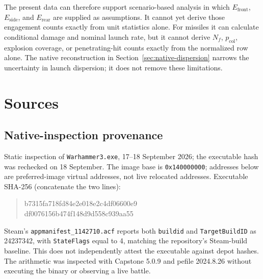 \documentclass[11pt]{article}
\begin{document}
The present data can therefore support scenario-based analysis in which
$E_{\mathrm{front}}$, $E_{\mathrm{side}}$, and $E_{\mathrm{rear}}$ are supplied
as assumptions.  It cannot yet derive those engagement counts exactly from
unit statistics alone.  For missiles it can calculate conditional damage and
nominal launch rate, but it cannot derive $N_f$, $p_{\mathrm{col}}$, explosion
coverage, or penetrating-hit counts exactly from the normalized row alone.
The native reconstruction in Section~\ref{sec:native-dispersion} narrows the
uncertainty in launch dispersion; it does not remove these limitations.

\section{Sources}

\subsection{Native-inspection provenance}
\label{sec:native-provenance}

Static inspection of \texttt{Warhammer3.exe}, 17--18 September 2026;
the executable hash was rechecked on 18 September.
The image base is \texttt{0x140000000}; addresses below are preferred-image
virtual addresses, not live relocated addresses.  Executable SHA-256
(concatenate the two lines):
\begin{quote}\ttfamily\small
b7315fa718fd84e2e018e2c4df06600e9\\
df0076156b474f148d9d558c939aa55
\end{quote}
Steam's \texttt{appmanifest\_1142710.acf} reports
both \texttt{buildid} and \texttt{TargetBuildID} as 24237342, with
\texttt{StateFlags} equal to 4, matching the repository's Steam-build baseline.
This does not independently attest the executable against depot hashes.
The arithmetic was inspected with Capstone 5.0.9 and pefile 2024.8.26 without
executing the binary or observing a live battle.
\end{document}
